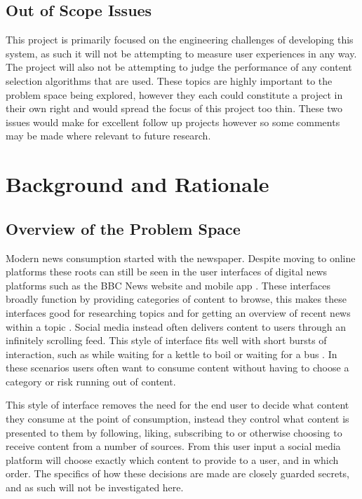 \documentclass[12pt,titlepage]{article}
\begin{document}
  \subsection{Out of Scope Issues}

  This project is primarily focused on the engineering challenges of developing
  this system, as such it will not be attempting to measure user experiences in
  any way. The project will also not be attempting to judge the performance of
  any content selection algorithms that are used. These topics are highly
  important to the problem space being explored, however they each could
  constitute a project in their own right and would spread the focus of this
  project too thin. These two issues would make for excellent follow up projects
  however so some comments may be made where relevant to future research.

\section{Background and Rationale}

  \subsection{Overview of the Problem Space}

  Modern news consumption started with the newspaper. Despite moving to online
  platforms these roots can still be seen in the user interfaces of digital news
  platforms such as the BBC News website and mobile app \citep{ofcom}. These
  interfaces broadly function by providing categories of content to browse, this
  makes these interfaces good for researching topics and for getting an overview
  of recent news within a topic \citep{yalanska_2021}. Social media instead often
  delivers content to users through an infinitely scrolling feed. This style of
  interface fits well with short bursts of interaction, such as while waiting
  for a kettle to boil or waiting for a bus \citep{yalanska_2020}. In these
  scenarios users often want to consume content without having to choose a
  category or risk running out of content.

  This style of interface removes the need for the end user to decide what
  content they consume at the point of consumption, instead they control what
  content is presented to them by following, liking, subscribing to or otherwise
  choosing to receive content from a number of sources. From this user input a
  social media platform will choose exactly which content to provide to a user,
  and in which order. The specifics of how these decisions are made are closely
  guarded secrets, and as such will not be investigated here.
\end{document}
